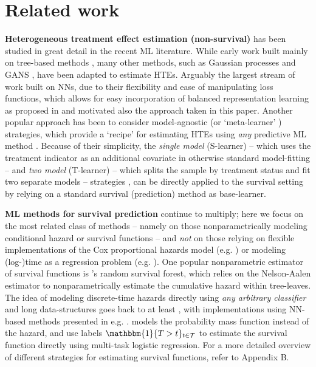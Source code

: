 \documentclass{article}
\begin{document}
\section{Related work}
\textbf{Heterogeneous treatment effect estimation (non-survival)} has been studied in great detail in the recent ML literature. While early work built mainly on tree-based methods \cite{hill2011bayesian, athey2016recursive, wager2018estimation, athey2019generalized}, many other methods, such as Gaussian processes \cite{alaa2017bayesian, alaa2018limits} and GANS \cite{yoon2018ganite}, have been adapted to estimate HTEs. Arguably the largest stream of work \cite{johansson2016learning, Shalit:16, johansson2018learning, shi2019adapting, hassanpour2019counterfactual, hassanpour2020learning, assaad2021counterfactual, curth2020} built on NNs, due to their flexibility and ease of manipulating loss functions, which allows for easy incorporation of balanced representation learning as proposed in \cite{johansson2016learning, Shalit:16} and motivated also the approach taken in this paper. Another popular approach has been to consider model-agnostic (or `meta-learner' \cite{kunzel2019metalearners}) strategies, which provide a `recipe' for estimating HTEs using \textit{any} predictive ML method \cite{kunzel2019metalearners, kennedy2020optimal, nie2021quasi, curth2020}. Because of their simplicity, the \textit{single model} (S-learner) -- which uses the treatment indicator as an additional covariate in otherwise standard model-fitting -- and \textit{two model} (T-learner) -- which splits the sample by treatment status and fit two separate models -- strategies \cite{kunzel2019metalearners}, can be directly applied to the survival setting by relying on a standard survival (prediction) method as base-learner. 

\textbf{ML methods for survival prediction} continue to multiply; here we focus on the most related class of methods -- namely on those nonparametrically modeling conditional hazard or survival functions  --  and \textit{not} on those relying on flexible implementations of the Cox proportional hazards model (e.g. \cite{faraggi1995neural, Katzman:16, Luck:17}) or modeling (log-)time as a regression problem (e.g. \cite{Hothorn:06, ranganath:16, chapfuwa2018adversarial, steingrimsson2019censoring, steingrimsson2020deep, avati2020countdown}). One popular nonparametric estimator of survival functions is \cite{Ishwaran:08}'s random survival forest, which relies on the Nelson-Aalen estimator to nonparametrically estimate the cumulative hazard within tree-leaves.  The idea of modeling discrete-time hazards directly using \textit{any arbitrary classifier} and long data-structures goes back to at least \cite{brown1975use}, with implementations using NN-based methods presented in e.g. \cite{biganzoli1998feed, gensheimer2019scalable, ren2017dsra, kvamme2019continuous}.  \cite{Changhee:AAAI18} models the probability mass function instead of the hazard, and \cite{yu2011learning} use labels $\mathbbm{1}\{T>t\}_{t \in \mathcal{T}}$ to estimate the survival function directly using multi-task logistic regression. For a more detailed overview of different strategies for estimating survival functions, refer to Appendix B. 
\end{document}
